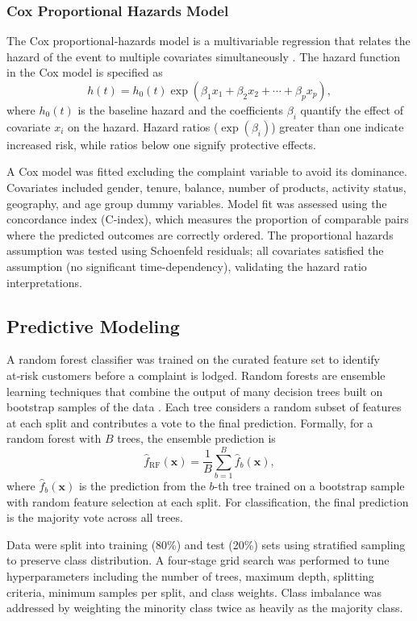 \documentclass[12pt]{article}
\begin{document}
\subsubsection{Cox Proportional Hazards Model}
The Cox proportional‑hazards model is a multivariable regression that relates the hazard of the event to multiple covariates simultaneously \citep{sthda_cox}. The hazard function in the Cox model is specified as
\[ h(t) = h_0(t) \exp(\beta_1 x_1 + \beta_2 x_2 + \cdots + \beta_p x_p), \]
where \(h_0(t)\) is the baseline hazard and the coefficients \(\beta_i\) quantify the effect of covariate \(x_i\) on the hazard. Hazard ratios (\(\exp(\beta_i)\)) greater than one indicate increased risk, while ratios below one signify protective effects.

A Cox model was fitted excluding the complaint variable to avoid its dominance. Covariates included gender, tenure, balance, number of products, activity status, geography, and age group dummy variables. Model fit was assessed using the concordance index (C-index), which measures the proportion of comparable pairs where the predicted outcomes are correctly ordered. The proportional hazards assumption was tested using Schoenfeld residuals; all covariates satisfied the assumption (no significant time-dependency), validating the hazard ratio interpretations.

\subsection{Predictive Modeling}
A random forest classifier was trained on the curated feature set to identify at‑risk customers before a complaint is lodged. Random forests are ensemble learning techniques that combine the output of many decision trees built on bootstrap samples of the data \citep{geeksforgeeks_randomforest}. Each tree considers a random subset of features at each split and contributes a vote to the final prediction. Formally, for a random forest with \(B\) trees, the ensemble prediction is
\[ \hat{f}_{\text{RF}}(\mathbf{x}) = \frac{1}{B} \sum_{b=1}^{B} \hat{f}_b(\mathbf{x}), \]
where \(\hat{f}_b(\mathbf{x})\) is the prediction from the \(b\)-th tree trained on a bootstrap sample with random feature selection at each split. For classification, the final prediction is the majority vote across all trees.

Data were split into training (80\%) and test (20\%) sets using stratified sampling to preserve class distribution. A four‑stage grid search was performed to tune hyperparameters including the number of trees, maximum depth, splitting criteria, minimum samples per split, and class weights. Class imbalance was addressed by weighting the minority class twice as heavily as the majority class.
\end{document}
